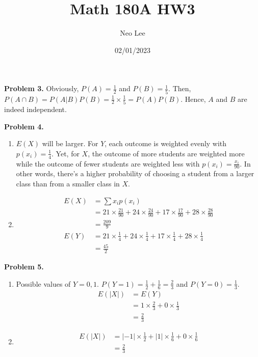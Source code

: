 \documentclass{article}
\title{Math 180A HW3}
\author{Neo Lee}
\date{02/01/2023}
\begin{document}
 

\maketitle 

\textbf{Problem 3.}
Obviously, $P(A)=\frac{1}{2}$ and $P(B)=\frac{1}{5}$. Then, $P(A \cap B)=P(A|B)P(B)=\frac{1}{2} \times \frac{1}{5}=P(A)P(B)$. 
Hence, $A$ and $B$ are indeed independent.
\bigbreak

\textbf{Problem 4.}
\begin{enumerate}[label={(\alph*)}]
    \item 
    $E(X)$ will be larger. For $Y$, each outcome is weighted evenly with $p(x_i)=\frac{1}{4}$.
    Yet, for $X$, the outcome of more students are weighted more while the outcome of fewer students are weighted less with $p(x_i)=\frac{x_i}{90}$.
    In other words, there's a higher probability of choosing a student from a larger class than from a smaller class in $X$.

    \item 
    \begin{align}
        E(X) & = \sum x_ip(x_i) \\
        & = 21 \times \frac{21}{90} + 24 \times \frac{24}{90} + 17 \times \frac{17}{90} + 28 \times \frac{28}{90} \\
        & = \frac{209}{9} \\
        E(Y) & = 21 \times \frac{1}{4} + 24 \times \frac{1}{4} + 17 \times \frac{1}{4} + 28 \times \frac{1}{4} \\
        & = \frac{45}{2}
    \end{align}
\end{enumerate}
\bigbreak

\textbf{Problem 5.}
\begin{enumerate}[label={(\alph*)}]
    \item 
    Possible values of $Y=0,1$. $P(Y=1)=\frac{1}{2}+\frac{1}{6}=\frac{2}{3}$ and $P(Y=0)=\frac{1}{3}$.
    \begin{align}
        E(|X|) & = E(Y) \\
        & = 1 \times \frac{2}{3} + 0 \times \frac{1}{3} \\
        & = \frac{2}{3}
    \end{align}

    \item 
    \begin{align}
        E(|X|) & = |-1| \times \frac{1}{2} + |1| \times \frac{1}{6} + 0 \times \frac{1}{6} \\
        & = \frac{2}{3}
    \end{align}
\end{enumerate}
\bigbreak
\end{document}
